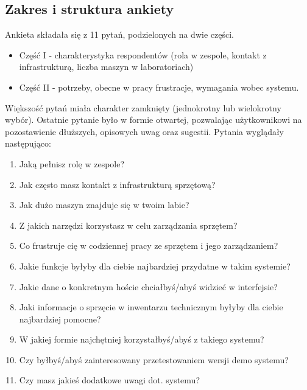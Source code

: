 \subsection{Zakres i struktura ankiety}
Ankieta składała się z 11 pytań, podzielonych na dwie części.
\begin{itemize}
    \item Część I - charakterystyka respondentów (rola w zespole, kontakt z infrastrukturą, liczba maszyn w laboratoriach)
    \item Część II - potrzeby, obecne w pracy frustracje, wymagania wobec systemu.
\end{itemize}
Większość pytań miała charakter zamknięty (jednokrotny lub wielokrotny wybór). Ostatnie pytanie było w formie otwartej, pozwalając użytkownikowi na pozostawienie dłuższych, opisowych uwag oraz sugestii. Pytania wyglądały następująco:
\begin{enumerate}
    \item Jaką pełnisz rolę w zespole?
    \item Jak często masz kontakt z infrastrukturą sprzętową?
    \item Jak dużo maszyn znajduje się w twoim labie?
    \item Z jakich narzędzi korzystasz w celu zarządzania sprzętem?
    \item Co frustruje cię w codziennej pracy ze sprzętem i jego zarządzaniem?
    \item Jakie funkcje byłyby dla ciebie najbardziej przydatne w takim systemie?
    \item Jakie dane o konkretnym hoście chciałbyś/abyś widzieć w interfejsie?
    \item Jaki informacje o sprzęcie w inwentarzu technicznym byłyby dla ciebie najbardziej pomocne?
    \item W jakiej formie najchętniej korzystałbyś/abyś z takiego systemu?
    \item Czy byłbyś/abyś zainteresowany przetestowaniem wersji demo systemu?
    \item Czy masz jakieś dodatkowe uwagi dot. systemu?
\end{enumerate}

